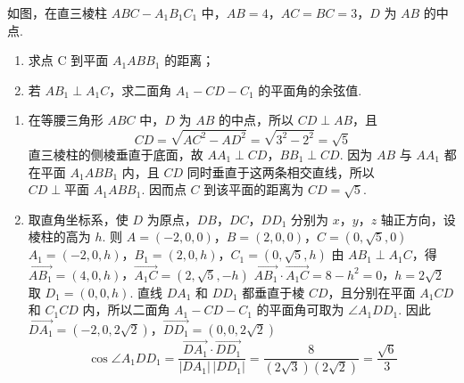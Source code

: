 \begin{problem}
如图，在直三棱柱 \(ABC - A_{1}B_{1}C_{1}\) 中，\(AB = 4\)，\(AC = BC = 3\)，\(D\) 为 \(AB\) 的中点.
\begin{enumerate}
\item 求点 C 到平面 \(A_{1}ABB_{1}\) 的距离；
\item 若 \(AB_{1} \perp A_{1}C\)，求二面角 \(A_{1} - CD - C_{1}\) 的平面角的余弦值.
\end{enumerate}

\begin{solution}
\begin{enumerate}
\item 在等腰三角形 \(ABC\) 中，\(D\) 为 \(AB\) 的中点，所以 \(CD\perp AB\)，且
\[
CD=\sqrt{AC^{2}-AD^{2}}=\sqrt{3^{2}-2^{2}}=\sqrt5
\]
直三棱柱的侧棱垂直于底面，故 \(AA_{1}\perp CD\)，\(BB_{1}\perp CD\). 因为 \(AB\) 与 \(AA_{1}\) 都在平面 \(A_{1}ABB_{1}\) 内，且 \(CD\) 同时垂直于这两条相交直线，所以 \(CD\perp\text{平面 }A_{1}ABB_{1}\). 因而点 \(C\) 到该平面的距离为 \(CD=\sqrt5\).

\item 取直角坐标系，使 \(D\) 为原点，\(DB\)，\(DC\)，\(DD_{1}\) 分别为 \(x\)，\(y\)，\(z\) 轴正方向，设棱柱的高为 \(h\). 则
\(A=(-2,0,0)\)，\(B=(2,0,0)\)，\(C=(0,\sqrt5,0)\)
\(A_{1}=(-2,0,h)\)，\(B_{1}=(2,0,h)\)，\(C_{1}=(0,\sqrt5,h)\)
由 \(AB_{1}\perp A_{1}C\)，得
\(\overrightarrow{AB_{1}}=(4,0,h)\)，\(\overrightarrow{A_{1}C}=(2,\sqrt5,-h)\)
\(\overrightarrow{AB_{1}}\cdot\overrightarrow{A_{1}C}=8-h^{2}=0\)，\(h=2\sqrt2\)
取 \(D_{1}=(0,0,h)\). 直线 \(DA_{1}\) 和 \(DD_{1}\) 都垂直于棱 \(CD\)，且分别在平面 \(A_{1}CD\) 和 \(C_{1}CD\) 内，所以二面角 \(A_{1}-CD-C_{1}\) 的平面角可取为 \(\angle A_{1}DD_{1}\). 因此
\(\overrightarrow{DA_{1}}=(-2,0,2\sqrt2)\)，\(\overrightarrow{DD_{1}}=(0,0,2\sqrt2)\)
\[
\cos\angle A_{1}DD_{1}
=\frac{\overrightarrow{DA_{1}}\cdot\overrightarrow{DD_{1}}}{|DA_{1}|\,|DD_{1}|}
=\frac{8}{(2\sqrt3)(2\sqrt2)}=\frac{\sqrt6}{3}
\]
\end{enumerate}
\end{solution}
\end{problem}


